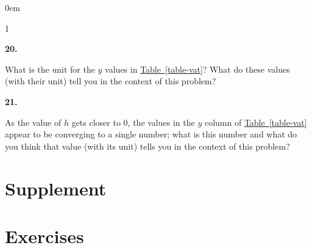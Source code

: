 \documentclass[12pt,]{book}
\theoremstyle{plain}
\theoremstyle{definition}
\numberwithin{equation}{section}
\newenvironment{exercisegroup}%
{\medskip\noindent}%
{\par\bigskip}%
\newlength{\exercisegroupindent}%
\newlength{\exercisegroupitemwidth}%
\newenvironment{exercisegrouplist}%
{\vspace{-\partopsep}%
\begin{adjustwidth}{\exercisegroupindent}{0em}}%
{\end{adjustwidth}%
\vspace{-\partopsep}%
\vspace{\baselineskip}}%
\newenvironment{exercisegroupbycol}[1]%
{\begin{exercisegrouplist}%
\vspace{-\multicolsep}%
\begin{multicols}{#1}%
\setlength{\parindent}{0em}%
\setlength{\exercisegroupitemwidth}{\linewidth}}%
{\end{multicols}%
\vspace{-\multicolsep}%
\end{exercisegrouplist}}%
\newenvironment{exercisegroupitem}[1]%
{\begin{minipage}[t]{\exercisegroupitemwidth}
\vspace{0pt}%
{\bfseries#1}%
\rule{0pt}{\baselineskip}}{\strut%
\end{minipage}%
\hspace{\columnsep}}%
\providecommand\phantomsection{}
\begin{document}
\begin{exercisegroup}
\begin{exercisegroupbycol}{1}
\begin{exercisegroupitem}{20. }\phantomsection\hypertarget{exercise-28}{\null}
What is the unit for the \(y\) values in \hyperref[table-vat]{Table~\ref*{table-vat}}? What do these values (with their unit) tell you in the context of this problem?%
\end{exercisegroupitem}%
\par%
\begin{exercisegroupitem}{21. }\phantomsection\hypertarget{exercise-vat-last}{\null}
As the value of \(h\) gets closer to \(0\), the values in the \(y\) column of \hyperref[table-vat]{Table~\ref*{table-vat}} appear to be converging to a single number; what is this number and what do you think that value (with its unit) tells you in the context of this problem?%
\end{exercisegroupitem}%
\par%
\end{exercisegroupbycol}%
\end{exercisegroup}%
\typeout{************************************************}
\typeout{************************************************}
\section[Supplement]{Supplement}\label{rates-of-change-supplementary-exercises}
\typeout{************************************************}
\typeout{************************************************}
\section*{Exercises}\label{exercises-4}
\end{document}
